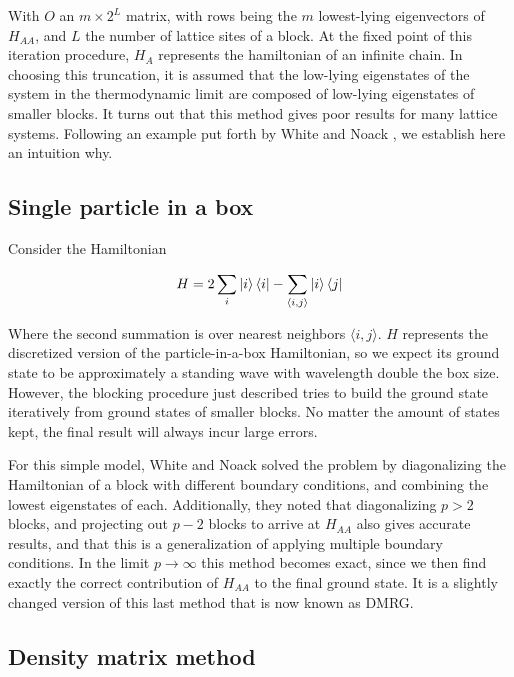 With $O$ an $m \times 2^L$ matrix, with rows being the $m$ lowest-lying
eigenvectors of $H_{AA}$, and $L$ the number of lattice sites of a block. At
the fixed point of this iteration procedure, $H_A$ represents the
hamiltonian of an infinite chain.  In choosing this truncation, it is assumed that the
low-lying eigenstates of the system in the thermodynamic limit are
composed of low-lying eigenstates of smaller blocks. It turns out that
this method gives poor results for many lattice systems. Following an
example put forth by White and Noack \cite{white1992real}, we establish
here an intuition why.

\subsection{Single particle in a box}

Consider the Hamiltonian

\begin{equation} 
  H = 2 \sum_i \ket{i}\bra{i} - \sum_{\langle i, j \rangle} \ket{i}\bra{j}
\end{equation}

Where the second summation is over nearest neighbors $\langle i,
j \rangle$. $H$ represents the discretized version of the
particle-in-a-box Hamiltonian, so we expect its ground state to be
approximately a standing wave with wavelength double the box size.
However, the blocking procedure just described tries to build the ground
state iteratively from ground states of smaller blocks. No matter the
amount of states kept, the final result will always incur large errors.

For this simple model, White and Noack solved the problem by diagonalizing
the Hamiltonian of a block with different boundary conditions, and
combining the lowest eigenstates of each. Additionally, they noted that
diagonalizing $p > 2$ blocks, and projecting out $p - 2$ blocks to arrive
at $H_{AA}$ also gives accurate results, and that this is a generalization
of applying multiple boundary conditions. In the limit $p \to \infty$
this method becomes exact, since we then find exactly the correct
contribution of $H_{AA}$ to the final ground state. It is a slightly
changed version of this last method that is now known as DMRG.


\subsection{Density matrix method}


